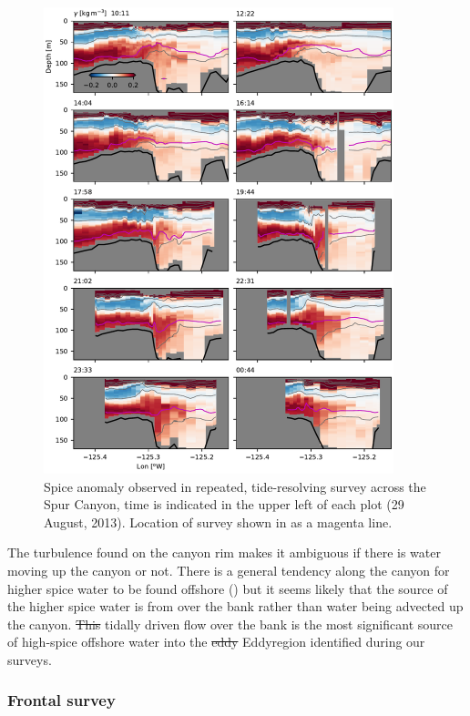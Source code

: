 \documentclass[draft]{agujournal2019}
\newcommand*{\Eddy}{{\sc Eddy}}
\providecommand{\DIFadd}[1]{{\protect\color{blue}\uwave{#1}}} %
\providecommand{\DIFdel}[1]{{\protect\color{red}\sout{#1}}}                      %
\providecommand{\DIFaddbegin}{} %
\providecommand{\DIFaddend}{} %
\providecommand{\DIFdelbegin}{} %
\providecommand{\DIFdelend}{} %
\begin{document}
\begin{figure}[htbp]
  \begin{center}
    \includegraphics[width=4in]{HydraulicsCanyon}
    \caption{Spice anomaly observed in repeated, tide-resolving survey across the Spur Canyon, time is indicated in the upper left of each plot (29 August, 2013).   Location of survey shown in  as a magenta line.
      \label{fig:HydraulicsCanyon}
    }
  \end{center}
\end{figure}

The turbulence found on the canyon rim makes it ambiguous if there is water moving up the canyon or not.  There is a general tendency along the canyon for higher spice water to be found offshore () but it seems likely that the source of the higher spice water is from over the bank rather than water being advected up the canyon.  \DIFdelbegin \DIFdel{This }\DIFdelend \DIFaddbegin \DIFadd{The }\DIFaddend tidally driven flow over the bank is the most significant source of high-spice offshore water into the \DIFdelbegin \DIFdel{eddy }\DIFdelend \DIFaddbegin \Eddy\DIFadd{\ }\DIFaddend region identified during our surveys.

\subsubsection{Frontal survey}
\label{sec:frontsurvey}
\end{document}
